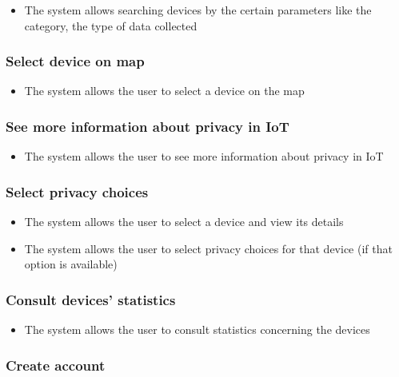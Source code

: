 \documentclass{scrreprt}
\begin{document}
\begin{itemize}
    \item The system allows searching devices by the certain parameters like the category, the type of data collected
\end{itemize}

\subsubsection{Select device on map}

\begin{itemize}
    \item The system allows the user to select a device on the map
\end{itemize}

\subsubsection{See more information about privacy in IoT}

\begin{itemize}
    \item The system allows the user to see more information about privacy in IoT
\end{itemize}

\subsubsection{Select privacy choices}

\begin{itemize}
    \item The system allows the user to select a device and view its details
    \item The system allows the user to select privacy choices for that device (if that option is available)
\end{itemize}

\subsubsection{Consult devices' statistics}

\begin{itemize}
    \item The system allows the user to consult statistics concerning the devices
\end{itemize}

\subsubsection{Create account}
\end{document}
